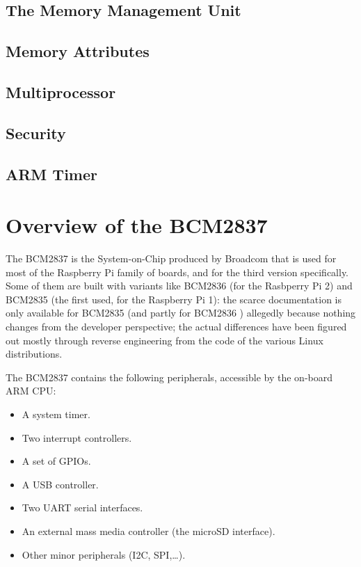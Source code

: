 \documentclass[12pt,a4paper,openright,twoside]{report}
\begin{document}
\section{The Memory Management Unit}

\section{Memory Attributes}

\section{Multiprocessor}

\section{Security}

\section{ARM Timer}

\clearpage{\pagestyle{empty}\cleardoublepage}
\chapter{Overview of the BCM2837}
The BCM2837 is the System-on-Chip produced by Broadcom that is used for most
of the Raspberry Pi family of boards, and for the third version specifically.
 Some of them are built with variants like BCM2836 (for the Rasbperry Pi 2)
  and BCM2835 (the first used, for the Raspberry Pi 1): the scarce documentation
  is only available for BCM2835 \cite{bcm2835} (and partly for BCM2836 \cite{rev3.4})
  allegedly because nothing changes from the developer perspective; the actual 
  differences have been figured out mostly through reverse engineering from the 
  code of the various Linux distributions.

The BCM2837 contains the following peripherals, accessible by the on-board ARM CPU:
\begin{itemize}
    \item A system timer.
    \item Two interrupt controllers.
    \item A set of GPIOs.
    \item A USB controller.
    \item Two UART serial interfaces.
    \item An external mass media controller (the microSD interface).
    \item Other minor peripherals (I2C, SPI,\ldots).
\end{itemize}
\end{document}
